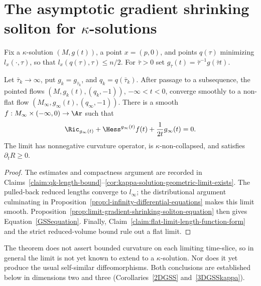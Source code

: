 \section{The asymptotic gradient shrinking soliton for
$\kappa$-solutions}\label{sect9.2}

Fix a $\kappa$-solution $(M,g(t))$, a point $x=(p,0)$, and points
$q(\tau)$ minimizing $l_x(\cdot,\tau)$, so that
$l_x(q(\tau),\tau)\leq n/2$. For $\bar\tau>0$ set
$g_{\bar\tau}(t)=\bar\tau^{-1}g(\bar\tau t)$.

\begin{theorem}\label{thm:asymptotic-gradient-shrinking-soliton}
\label{asympGSS}
Let $\bar\tau_k\to\infty$, put $g_k=g_{\bar\tau_k}$, and
$q_k=q(\bar\tau_k)$. After passage to a subsequence, the pointed
flows $(M,g_k(t),(q_k,-1))$, $-\infty<t<0$, converge smoothly to a
non-flat flow $(M_\infty,g_\infty(t),(q_\infty,-1))$. There is a
smooth $f:M_\infty\times(-\infty,0)\to\Ar$ such that
\begin{equation}\label{GSSequation}
 \Ric_{g_\infty(t)}+\Hess^{g_\infty(t)}f(t)
 +\frac1{2t}g_\infty(t)=0.
\end{equation}
The limit has nonnegative curvature operator, is
$\kappa$-non-collapsed, and satisfies $\partial_tR\geq0$.
\end{theorem}
\begin{proof}
\sketch The estimates and compactness argument are recorded in
Claims~\ref{claim:qk-length-bound}--\ref{cor:kappa-solution-geometric-limit-exists}.
The pulled-back reduced lengths converge to $l_\infty$; the
distributional argument culminating in
Proposition~\ref{prop:l-infinity-differential-equations} makes this
limit smooth. Proposition~\ref{prop:limit-gradient-shrinking-soliton-equation}
then gives Equation~\ref{GSSequation}. Finally,
Claim~\ref{claim:flat-limit-length-function-form} and the strict
reduced-volume bound rule out a flat limit.
\end{proof}

\begin{remark}\label{rem:asymptotic-soliton-caveats}
The theorem does not assert bounded curvature on each limiting
time-slice, so in general the limit is not yet known to extend to a
$\kappa$-solution. Nor does it yet produce the usual self-similar
diffeomorphisms. Both conclusions are established below in dimensions
two and three (Corollaries~\ref{2DGSS} and~\ref{3DGSSkappa}).
\end{remark}

